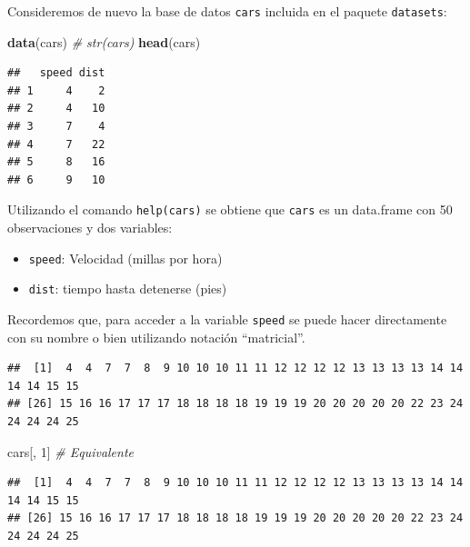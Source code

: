 \documentclass[
]{book}
\newenvironment{Shaded}{\begin{snugshade}}{\end{snugshade}}
\newcommand{\CommentTok}[1]{\textcolor[rgb]{0.56,0.35,0.01}{\textit{#1}}}
\newcommand{\DecValTok}[1]{\textcolor[rgb]{0.00,0.00,0.81}{#1}}
\newcommand{\KeywordTok}[1]{\textcolor[rgb]{0.13,0.29,0.53}{\textbf{#1}}}
\newcommand{\NormalTok}[1]{#1}
\newcommand{\OperatorTok}[1]{\textcolor[rgb]{0.81,0.36,0.00}{\textbf{#1}}}
\begin{document}
Consideremos de nuevo la
base de datos \texttt{cars} incluida en el paquete \texttt{datasets}:

\begin{Shaded}
\begin{Highlighting}[]
\KeywordTok{data}\NormalTok{(cars)}
\CommentTok{# str(cars)}
\KeywordTok{head}\NormalTok{(cars)}
\end{Highlighting}
\end{Shaded}

\begin{verbatim}
##   speed dist
## 1     4    2
## 2     4   10
## 3     7    4
## 4     7   22
## 5     8   16
## 6     9   10
\end{verbatim}

Utilizando el comando \texttt{help(cars)}
se obtiene que \texttt{cars} es un data.frame con 50 observaciones y dos
variables:

\begin{itemize}
\item
  \texttt{speed}: Velocidad (millas por hora)
\item
  \texttt{dist}: tiempo hasta detenerse (pies)
\end{itemize}

Recordemos que, para acceder a la variable \texttt{speed} se puede
hacer directamente con su nombre o bien utilizando notación
``matricial''.

\begin{Shaded}
\end{Shaded}

\begin{verbatim}
##  [1]  4  4  7  7  8  9 10 10 10 11 11 12 12 12 12 13 13 13 13 14 14 14 14 15 15
## [26] 15 16 16 17 17 17 18 18 18 18 19 19 19 20 20 20 20 20 22 23 24 24 24 24 25
\end{verbatim}

\begin{Shaded}
\begin{Highlighting}[]
\NormalTok{cars[, }\DecValTok{1}\NormalTok{]  }\CommentTok{# Equivalente}
\end{Highlighting}
\end{Shaded}

\begin{verbatim}
##  [1]  4  4  7  7  8  9 10 10 10 11 11 12 12 12 12 13 13 13 13 14 14 14 14 15 15
## [26] 15 16 16 17 17 17 18 18 18 18 19 19 19 20 20 20 20 20 22 23 24 24 24 24 25
\end{verbatim}
\end{document}
